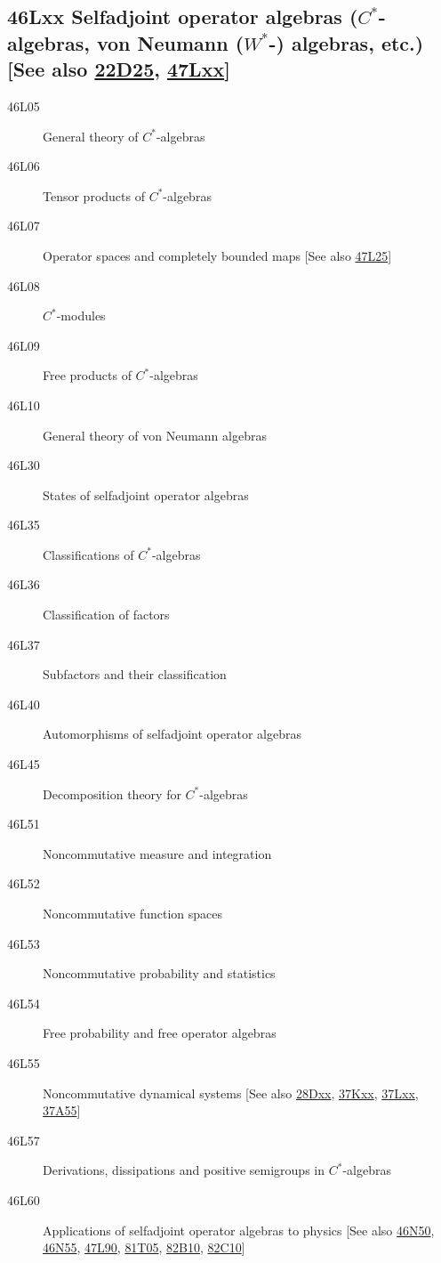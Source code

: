 \documentclass[letterpaper]{article}
\begin{document}
\subsection*{46Lxx  Selfadjoint operator algebras ($C^*$-algebras, von Neumann ($W^*$-) algebras, etc.) [See also \hyperref[22D25]{22D25}, \hyperref[47Lxx]{47Lxx}] }\label{46Lxx}
\begin{description}  
\item [46L05]\label{46L05} General theory of $C^*$-algebras
\item [46L06]\label{46L06} Tensor products of $C^*$-algebras
\item [46L07]\label{46L07} Operator spaces and completely bounded maps [See also \hyperref[47L25]{47L25}]
\item [46L08]\label{46L08} $C^*$-modules
\item [46L09]\label{46L09} Free products of $C^*$-algebras
\item [46L10]\label{46L10} General theory of von Neumann algebras
\item [46L30]\label{46L30} States of selfadjoint operator algebras
\item [46L35]\label{46L35} Classifications of $C^*$-algebras
\item [46L36]\label{46L36} Classification of factors
\item [46L37]\label{46L37} Subfactors and their classification
\item [46L40]\label{46L40} Automorphisms of selfadjoint operator algebras
\item [46L45]\label{46L45} Decomposition theory for $C^*$-algebras
\item [46L51]\label{46L51} Noncommutative measure and integration
\item [46L52]\label{46L52} Noncommutative function spaces
\item [46L53]\label{46L53} Noncommutative probability and statistics
\item [46L54]\label{46L54} Free probability and free operator algebras
\item [46L55]\label{46L55} Noncommutative dynamical systems [See also \hyperref[28Dxx]{28Dxx},  \hyperref[37Kxx]{37Kxx}, \hyperref[37Lxx]{37Lxx}, \hyperref[37A55]{37A55}]
\item [46L57]\label{46L57} Derivations, dissipations and positive semigroups in $C^*$-algebras
\item [46L60]\label{46L60} Applications of selfadjoint operator algebras to physics [See also \hyperref[46N50]{46N50}, \hyperref[46N55]{46N55}, \hyperref[47L90]{47L90}, \hyperref[81T05]{81T05}, \hyperref[82B10]{82B10}, \hyperref[82C10]{82C10}]

\end{description}
\end{document}

